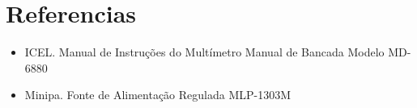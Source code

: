 \section{Referencias}
    \begin{itemize}
        \item ICEL. Manual de Instruções do Multímetro Manual de Bancada Modelo MD-6880
        \item Minipa. Fonte de Alimentação Regulada MLP-1303M
    \end{itemize}
